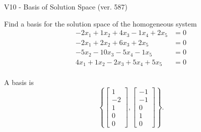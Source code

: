 \begin{exercise}
  \begin{exerciseTitle}V10 - Basis of Solution Space (ver. 587)\end{exerciseTitle}
  \begin{exerciseStatement}
    Find a basis for the solution space of the homogeneous system 
\begin{align*}
 -2 x_ 1 + 1 x_ 2 + 4 x_ 3 -1 x_ 4 + 2 x_ 5 &= 0  \\ 
  -2 x_ 1 + 2 x_ 2 + 6 x_ 3 + 2 x_ 5 &= 0  \\ 
  -5 x_ 2 -10 x_ 3 -5 x_ 4 -1 x_ 5 &= 0  \\ 
  4 x_ 1 + 1 x_ 2 -2 x_ 3 + 5 x_ 4 + 5 x_ 5 &= 0  \\ 
 \end{align*}


 
  \end{exerciseStatement}

  \begin{exerciseAnswer}
   A basis is   
\[\left\{\left[\begin{array}{c}
1 \\
-2 \\
1 \\
0 \\
0
\end{array}\right] , \left[\begin{array}{c}
-1 \\
-1 \\
0 \\
1 \\
0
\end{array}\right]\right\}.\]

  


  \end{exerciseAnswer}
\end{exercise}